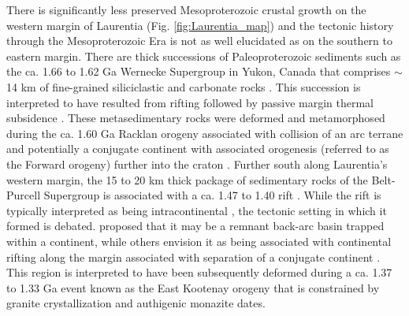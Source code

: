 \documentclass[twocolumn, switch]{article} %
\begin{document}
There is significantly less preserved Mesoproterozoic crustal growth on the western margin of Laurentia (Fig. \ref{fig:Laurentia_map}) and the tectonic history through the Mesoproterozoic Era is not as well elucidated as on the southern to eastern margin. There are thick successions of Paleoproterozoic sediments such as the ca. 1.66 to 1.62 Ga Wernecke Supergroup in Yukon, Canada that comprises $\sim$14 km of  fine-grained siliciclastic and carbonate rocks \citep{Furlanetto2016a}. This succession is interpreted to have resulted from rifting followed by passive margin thermal subsidence \citep{Furlanetto2016a}. These metasedimentary rocks were deformed and metamorphosed during the ca. 1.60 Ga Racklan orogeny associated with collision of an arc terrane and potentially a conjugate continent with associated orogenesis (referred to as the Forward orogeny) further into the craton \citep{Thorkelson2005a, Furlanetto2013a, Furlanetto2016a}. Further south along Laurentia's western margin, the 15 to 20 km thick package of sedimentary rocks of the Belt-Purcell Supergroup is associated with a ca. 1.47 to 1.40 rift \citep{Evans2000c}. While the rift is typically interpreted as being intracontinental \citep{Lydon2004a}, the tectonic setting in which it formed is debated. \citet{Hoffman1989c} proposed that it may be a remnant back-arc basin trapped within a continent, while others envision it as being associated with continental rifting along the margin associated with separation of a conjugate continent \citep{Jones2015a}. This region is interpreted to have been subsequently deformed during a ca. 1.37 to 1.33 Ga event known as the East Kootenay orogeny that is constrained by granite crystallization and authigenic monazite dates\citep{McMechan1982a, Nesheim2012a, McFarlane2015a}.
\end{document}
